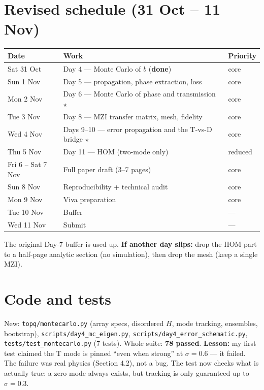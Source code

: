 \documentclass[10pt,a4paper]{article}
\begin{document}
\section{Revised schedule (31 Oct -- 11 Nov)}
\begin{tabular}{@{}lll@{}}\toprule
Date & Work & Priority\\\midrule
Sat 31 Oct & Day 4 --- Monte Carlo of $b$ (\textbf{done}) & core\\
Sun 1 Nov & Day 5 --- propagation, phase extraction, loss & core\\
Mon 2 Nov & Day 6 --- Monte Carlo of phase and transmission $\star$ & core\\
Tue 3 Nov & Day 8 --- MZI transfer matrix, mesh, fidelity & core\\
Wed 4 Nov & Days 9--10 --- error propagation and the T-vs-D bridge $\star$ & core\\
Thu 5 Nov & Day 11 --- HOM (two-mode only) & reduced\\
Fri 6 -- Sat 7 Nov & Full paper draft (3--7 pages) & core\\
Sun 8 Nov & Reproducibility + technical audit & core\\
Mon 9 Nov & Viva preparation & core\\
Tue 10 Nov & Buffer & ---\\
Wed 11 Nov & Submit & ---\\\bottomrule
\end{tabular}
\smallskip

The original Day-7 buffer is used up. \textbf{If another day slips:} drop the HOM part to a half-page analytic section (no simulation), then drop the mesh (keep a single MZI).

\section{Code and tests}
New: \texttt{topq/montecarlo.py} (array specs, disordered $H$, mode tracking, ensembles, bootstrap), \texttt{scripts/day4\_mc\_eigen.py}, \texttt{scripts/day4\_error\_schematic.py}, \texttt{tests/test\_montecarlo.py} (7 tests). Whole suite: \textbf{78 passed}.
\textbf{Lesson:} my first test claimed the T mode is pinned ``even when strong'' at $\sigma=0.6$ --- it failed. The failure was real physics (Section 4.2), not a bug. The test now checks what is actually true: a zero mode always exists, but tracking is only guaranteed up to $\sigma=0.3$.
\end{document}
